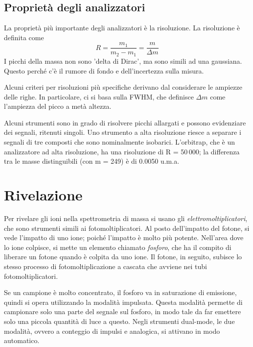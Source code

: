 \subsection{Proprietà degli analizzatori}
La proprietà più importante degli analizzatori è la risoluzione.
La risoluzione è definita come
\[
R = \frac{m_1}{m_2 - m_1} = \frac{m}{\Delta m}
\]
I picchi della massa non sono 'delta di Dirac', ma sono simili ad una gaussiana.
Questo perché c'è il rumore di fondo e dell'incertezza sulla misura.


Alcuni criteri per risoluzioni più specifiche derivano dal considerare le ampiezze delle righe.
In particolare, ci si basa sulla FWHM, che definisce $\Delta m$ come l'ampiezza del picco a metà altezza.

Alcuni strumenti sono in grado di risolvere picchi allargati e possono evidenziare dei segnali, ritenuti singoli.
Uno strumento a alta risoluzione riesce a separare i segnali di tre composti che sono nominalmente isobarici.
L'orbitrap, che è un analizzatore ad alta risoluzione, ha una risoluzione di R = 50\,000; la differenza tra le masse distinguibili (con m = 249) è di 0.0050 u.m.a.



\section{Rivelazione}
Per rivelare gli ioni nella spettrometria di massa si usano gli \emph{elettromoltiplicatori}, che sono strumenti simili ai fotomoltiplicatori.
Al posto dell'impatto del fotone, si vede l'impatto di uno ione; poiché l'impatto è molto più potente.
Nell'area dove lo ione colpisce, si mette un elemento chiamato \emph{fosforo}, che ha il compito di liberare un fotone quando è colpita da uno ione.
Il fotone, in seguito, subisce lo stesso processo di fotomoltiplicazione a cascata che avviene nei tubi fotomoltiplicatori.


Se un campione è molto concentrato, il fosforo va in saturazione di emissione, quindi si opera utilizzando la modalità impulsata.
Questa modalità permette di campionare solo una parte del segnale sul fosforo, in modo tale da far emettere solo una piccola quantità di luce a questo.
Negli strumenti dual-mode, le due modalità, ovvero a conteggio di impulsi e analogica, si attivano in modo automatico.




